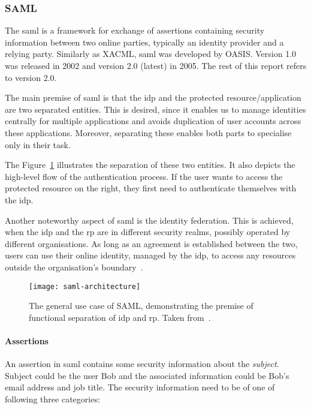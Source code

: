 \subsubsection{SAML}\label{sec:saml}

The \acrfull{saml} is a framework for exchange of assertions containing security information between two online parties, typically an identity provider and a relying party. Similarly as XACML, \acrshort{saml} was developed by OASIS. Version 1.0 was released in 2002 and version 2.0 (latest) in 2005. The rest of this report refers to version 2.0.

The main premise of \acrshort{saml} is that the \acrfull{idp} and the protected resource/application are two separated entities. This is desired, since it enables us to manage identities centrally for multiple applications and avoids duplication of user accounts across these applications. Moreover, separating these enables both parts to specialise only in their task.

The Figure~\ref{fig:saml-architectire} illustrates the separation of these two entities. It also depicts the high-level flow of the authentication process. If the user wants to access the protected resource on the right, they first need to authenticate themselves with the \acrshort{idp}.

Another noteworthy aspect of \acrshort{saml} is the identity federation. This is achieved, when the \acrshort{idp} and the \acrshort{rp} are in different security realms, possibly operated by different organisations. As long as an agreement is established between the two, users can use their online identity, managed by the \acrshort{idp}, to access any resources outside the organisation's boundary~\cite{2008SecurityOverview}.

 \begin{figure}[ht]
    \centering
    \texttt{[image: saml-architecture]}
    \caption{The general use case of SAML, demonstrating the premise of functional separation of \acrshort{idp} and \acrshort{rp}. Taken from~\cite{2008SecurityOverview}.}
    \label{fig:saml-architectire}
\end{figure}

\paragraph{Assertions}
An assertion in \acrshort{saml} contains some security information about the \textit{subject}. Subject could be the user Bob and the associated information could be Bob's email address and job title. The security information need to be of one of following three categories:

